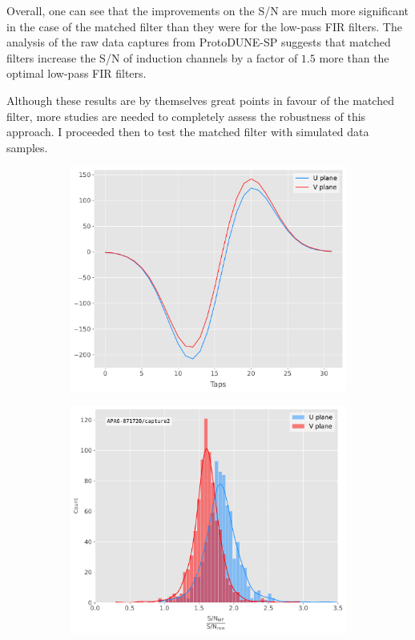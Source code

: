 Overall, one can see that the improvements on the S/N are much more significant in the case of the matched filter than they were for the low-pass FIR filters. The analysis of the raw data captures from ProtoDUNE-SP suggests that matched filters increase the S/N of induction channels by a factor of $1.5$ more than the optimal low-pass FIR filters.

Although these results are by themselves great points in favour of the matched filter, more studies are needed to completely assess the robustness of this approach. I proceeded then to test the matched filter with simulated data samples.

\begin{figure}[t]
	\begin{subfigure}{0.5\textwidth}
		\centering
		\includegraphics[width=.99\linewidth]{Images/Matched_Filter/optimal_coeffs}
	\end{subfigure}
	\begin{subfigure}{0.5\textwidth}
		\centering
		\includegraphics[width=.99\linewidth]{Images/Matched_Filter/improvement_capture}

\end{subfigure}
\end{figure}
